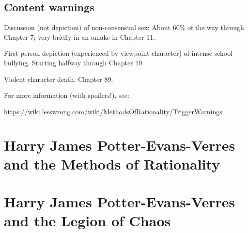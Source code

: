 \RequirePackage[pdf]{layout/hp-book}


{
\pagestyle{empty}



\chapter*{Content warnings}
\thispagestyle{empty}

Discussion (not depiction) of non-consensual sex: About 60\% of the way through Chapter 7; very briefly in an omake in Chapter 11.

First-person depiction (experienced by viewpoint character) of intense school bullying. Starting halfway through Chapter 19.

Violent character death. Chapter 89.

For more information (with spoilers!), see:
\begin{center}\url{https://wiki.lesswrong.com/wiki/MethodsOfRationality/TriggerWarnings}\end{center}


\cleartorecto
}
\setcounter{page}{1}


\part{Harry James Potter-Evans-Verres and the Methods of Rationality}










\setcounter{chapter}{11}










\part{Harry James Potter-Evans-Verres and the Legion of Chaos}
















